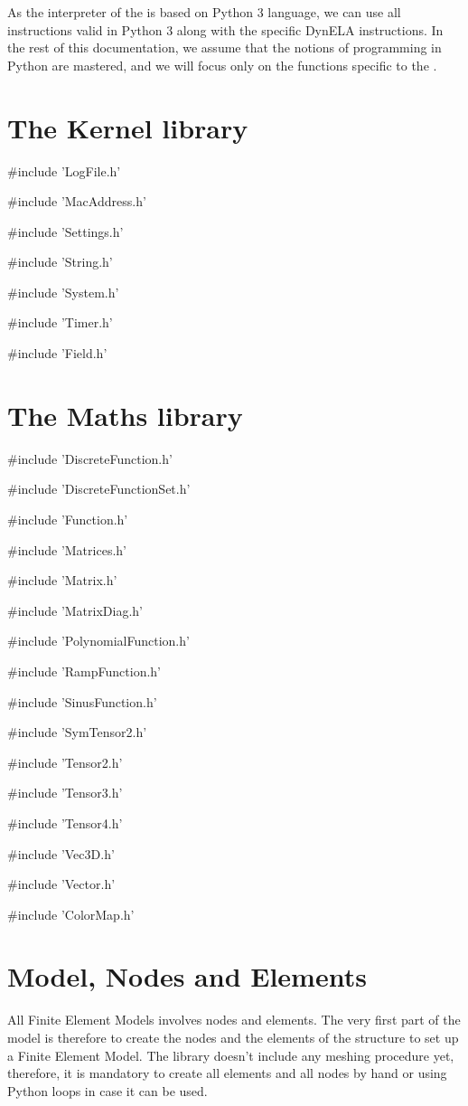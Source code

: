 As the interpreter of the \DynELA is based on Python 3 language, we can use all instructions valid in Python 3 along with the specific DynELA instructions. In the rest of this documentation, we assume that the notions of programming in Python are mastered, and we will focus only on the functions specific to the \DynELA.

\section{The Kernel library}

\#include 'LogFile.h'

\#include 'MacAddress.h'

\#include 'Settings.h'

\#include 'String.h'

\#include 'System.h'

\#include 'Timer.h'

\#include 'Field.h'

\section{The Maths library}

\#include 'DiscreteFunction.h'

\#include 'DiscreteFunctionSet.h'

\#include 'Function.h'

\#include 'Matrices.h'

\#include 'Matrix.h'

\#include 'MatrixDiag.h'

\#include 'PolynomialFunction.h'

\#include 'RampFunction.h'

\#include 'SinusFunction.h'

\#include 'SymTensor2.h'

\#include 'Tensor2.h'

\#include 'Tensor3.h'

\#include 'Tensor4.h'

\#include 'Vec3D.h'

\#include 'Vector.h'

\#include 'ColorMap.h'

\section{Model, Nodes and Elements}

All Finite Element Models involves nodes and elements. The very first part of the model is therefore to create the nodes and the elements of the structure to set up a Finite Element Model. The \DynELA library doesn't include any meshing procedure yet, therefore, it is mandatory to create all elements and all nodes by hand or using Python loops in case it can be used.

